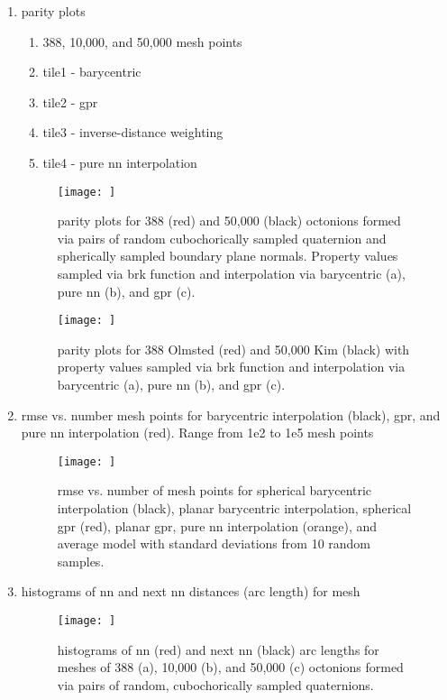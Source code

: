 \documentclass[preprint,12pt]{elsarticle}
\begin{document}
\begin{enumerate}
    \item parity plots
    \begin{enumerate}
        \item 388, 10,000, and 50,000 mesh points
        \item tile1 - barycentric
        \item tile2 - \gls{gpr}
        \item tile3 - inverse-distance weighting
        \item tile4 - pure \gls{nn} interpolation
    \end{enumerate}
    \begin{figure}
        \centering
        \texttt{[image: ]}
        \caption{parity plots for 388 (red) and 50,000 (black) octonions formed via pairs of random cubochorically sampled quaternion and spherically sampled boundary plane normals. Property values sampled via \acrlong{brk} function and interpolation via barycentric (a), pure \acrlong{nn} (b), and \acrlong{gpr} (c).}
        \label{fig:brk-parity1}
    \end{figure}
    \begin{figure}
        \centering
        \texttt{[image: ]}
        \caption{parity plots for 388 Olmsted  (red) and 50,000 Kim  (black) with property values sampled via \acrlong{brk} function and interpolation via barycentric (a), pure \acrlong{nn} (b), and \acrlong{gpr} (c).}
        \label{fig:brk-parity2}
    \end{figure}
    \item \Gls{rmse} vs. number mesh points for barycentric interpolation (black), \gls{gpr}, and pure \gls{nn} interpolation (red). Range from 1e2 to 1e5 mesh points
    \begin{figure}
        \centering
        \texttt{[image: ]}
        \caption{\acrlong{rmse} vs. number of mesh points for spherical barycentric interpolation (black), planar barycentric interpolation, spherical \acrlong{gpr} (red), planar \gls{gpr}, pure \acrlong{nn} interpolation (orange), and average model with standard deviations from 10 random samples.}
        \label{fig:brk-rmse}
    \end{figure}
    \item histograms of \gls{nn} and next \gls{nn} distances (arc length) for mesh
    \begin{figure}
        \centering
        \texttt{[image: ]}
        \caption{histograms of \acrfull{nn} (red) and next \acrlong{nn} (black) arc lengths for meshes of 388 (a), 10,000 (b), and 50,000 (c) octonions formed via pairs of random, cubochorically sampled quaternions.}

\end{figure}
\end{enumerate}
\end{document}
